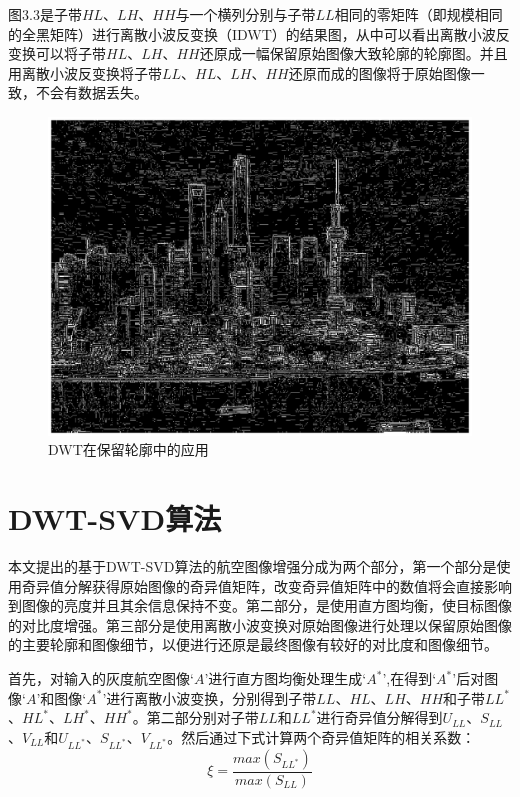 \documentclass[12pt]{book}
\begin{document}
图$3.3$是子带$HL$、$LH$、$HH$与一个横列分别与子带$LL$相同的零矩阵（即规模相同的全黑矩阵）进行离散小波反变换（IDWT）的结果图，从中可以看出离散小波反变换可以将子带$HL$、$LH$、$HH$还原成一幅保留原始图像大致轮廓的轮廓图。并且用离散小波反变换将子带$LL$、$HL$、$LH$、$HH$还原而成的图像将于原始图像一致，不会有数据丢失。
			\begin{figure}[!ht]\centering
				\includegraphics[totalheight=60mm]{./figures/replaceImageLL.eps}
				\caption{DWT在保留轮廓中的应用\label{DWT}}
			\end{figure}


	\section{DWT-SVD算法}本文提出的基于DWT-SVD算法的航空图像增强分成为两个部分，第一个部分是使用奇异值分解获得原始图像的奇异值矩阵，改变奇异值矩阵中的数值将会直接影响到图像的亮度并且其余信息保持不变\cite{improved...}。第二部分，是使用直方图均衡，使目标图像的对比度增强。第三部分是使用离散小波变换对原始图像进行处理以保留原始图像的主要轮廓和图像细节，以便进行还原是最终图像有较好的对比度和图像细节。

首先，对输入的灰度航空图像‘$A$’进行直方图均衡处理生成‘$A^*$’,在得到‘$A^*$’后对图像‘$A$’和图像‘$A^*$’进行离散小波变换，分别得到子带$LL$、$HL$、$LH$、$HH$和子带$LL^*$、$HL^*$、$LH^*$、$HH^*$。第二部分别对子带$LL$和$LL^*$进行奇异值分解得到$U_{LL}$、$S_{LL}$、$V_{LL}$和$U_ {LL^*}$、$S_{LL^*}$、$V_{LL^*}$。然后通过下式计算两个奇异值矩阵的相关系数：
\begin{equation}     \xi = \frac{max \left( S_{LL^*} \right) }{ max \left( S_{LL} \right) }    \end{equation}
\end{document}
